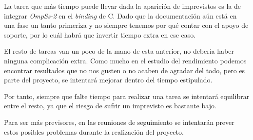 La tarea que más tiempo puede llevar dada la aparición de imprevistos es la de integrar \textit{OmpSs-2} en el \textit{binding} de C. Dado que la documentación aún está en una fase un tanto primeriza y no siempre tenemos por qué contar con el apoyo de soporte, por lo cuál habrá que invertir tiempo extra en ese caso. 
\par\medskip
El resto de tareas van un poco de la mano de esta anterior, no debería haber ninguna complicación extra. Como mucho en el estudio del rendimiento podemos encontrar resultados que no nos gusten o no acaben de agradar del todo, pero es parte del proyecto, se intentará mejorar dentro del tiempo estipulado. 
\par\medskip
Por tanto, siempre que falte tiempo para realizar una tarea se intentará equilibrar entre el resto, ya que el riesgo de sufrir un imprevisto es bastante bajo.
\par\bigskip
Para ser más previsores, en las reuniones de seguimiento se intentarán prever estos posibles problemas durante la realización del proyecto. 



















